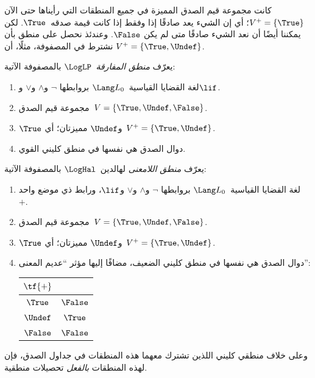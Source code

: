 \documentclass[../../../include/open-logic-section]{subfiles}
\begin{document}


كانت مجموعة قيم الصدق المميزة في جميع المنطقات التي رأيناها حتى الآن
$V^+ = \{\True\}$؛ أي إن الشيء يعد صادقًا إذا وفقط إذا كانت قيمة
صدقه~$\True$. لكن يمكننا أيضًا أن نعد الشيء صادقًا متى لم يكن
$\False$. وعندئذ نحصل على منطق بأن نشترط في المصفوفة، مثلًا، أن
$V^+ = \{\True, \Undef\}$.

\begin{defn}
يعرّف \emph{منطق المفارقة}~$\LogLP$ بالمصفوفة الآتية:
\begin{enumerate}
  \item لغة القضايا القياسية~$\Lang L_0$ بروابطها
  $\lnot$ و$\land$ و$\lor$ و$\lif$.
  \item مجموعة قيم الصدق~$V = \{\True, \Undef, \False\}$.
  \item $\True$ و$\Undef$ مميزتان؛ أي~$V^+ = \{\True, \Undef\}$.
  \item دوال الصدق هي نفسها في منطق كليني القوي.
\end{enumerate}
\end{defn}

\begin{defn}
يعرّف \emph{منطق اللامعنى} لهالدين~$\LogHal$ بالمصفوفة الآتية:
\begin{enumerate}
  \item لغة القضايا القياسية~$\Lang L_0$ بروابطها
  $\lnot$ و$\land$ و$\lor$ و$\lif$، ورابط ذي موضع واحد~$+$.
  \item مجموعة قيم الصدق~$V = \{\True, \Undef, \False\}$.
  \item $\True$ و$\Undef$ مميزتان؛ أي~$V^+ = \{\True, \Undef\}$.
  \item دوال الصدق هي نفسها في منطق كليني الضعيف، مضافًا إليها مؤثر
  ``عديم المعنى'':
  \begin{center}
    \begin{tabular}{c|c}
    $\tf{+}$ & \\
    \hline
    $\True$ & $\False$ \\
    $\Undef$ & $\True$ \\
    $\False$ & $\False$
    \end{tabular}
  \end{center}
\end{enumerate}
\end{defn}

وعلى خلاف منطقي كليني اللذين تشترك معهما هذه المنطقات في جداول الصدق،
فإن لهذه المنطقات \emph{بالفعل} تحصيلات منطقية.
\end{document}
